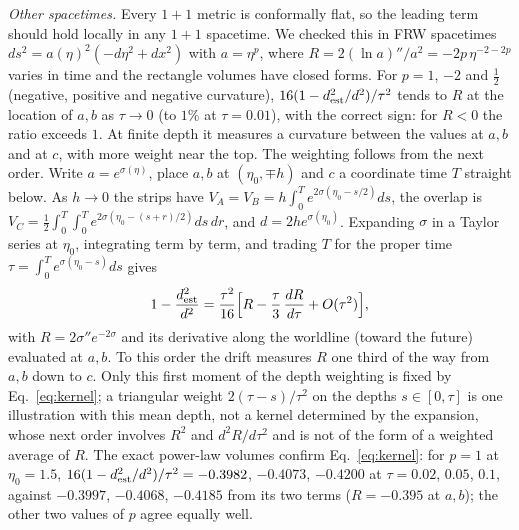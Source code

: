 \documentclass[prd,twocolumn,superscriptaddress,nofootinbib,amsmath,amssymb,floatfix]{revtex4-2}
\begin{document}
\emph{Other spacetimes.} Every $1+1$ metric is conformally flat, so the leading term should hold locally in any $1+1$ spacetime. We checked this in FRW spacetimes $ds^2=a(\eta)^2(-d\eta^2+dx^2)$ with $a=\eta^p$, where $R=2(\ln a)''/a^2=-2p\,\eta^{-2-2p}$ varies in time and the rectangle volumes have closed forms. For $p=1$, $-2$ and $\tfrac12$ (negative, positive and negative curvature), $16(1-d^2_{\rm est}/d^2)/\tau^2$ tends to $R$ at the location of $a,b$ as $\tau\to0$ (to $1\%$ at $\tau=0.01$), with the correct sign: for $R<0$ the ratio exceeds $1$. At finite depth it measures a curvature between the values at $a,b$ and at $c$, with more weight near the top. The weighting follows from the next order. Write $a=e^{\sigma(\eta)}$, place $a,b$ at $(\eta_0,\mp h)$ and $c$ a coordinate time $T$ straight below. As $h\to0$ the strips have $V_A=V_B=h\int_0^Te^{2\sigma(\eta_0-s/2)}ds$, the overlap is $V_C=\tfrac12\int_0^T\!\!\int_0^Te^{2\sigma(\eta_0-(s+r)/2)}ds\,dr$, and $d=2he^{\sigma(\eta_0)}$. Expanding $\sigma$ in a Taylor series at $\eta_0$, integrating term by term, and trading $T$ for the proper time $\tau=\int_0^Te^{\sigma(\eta_0-s)}ds$ gives
\begin{equation}
1-\frac{d^2_{\rm est}}{d^2}=\frac{\tau^2}{16}\Big[R-\frac{\tau}{3}\,\frac{dR}{d\tau}+O(\tau^2)\Big],
\label{eq:kernel}
\end{equation}
with $R=2\sigma''e^{-2\sigma}$ and its derivative along the worldline (toward the future) evaluated at $a,b$. To this order the drift measures $R$ one third of the way from $a,b$ down to $c$. Only this first moment of the depth weighting is fixed by Eq.~\eqref{eq:kernel}; a triangular weight $2(\tau-s)/\tau^2$ on the depths $s\in[0,\tau]$ is one illustration with this mean depth, not a kernel determined by the expansion, whose next order involves $R^2$ and $d^2R/d\tau^2$ and is not of the form of a weighted average of $R$. The exact power-law volumes confirm Eq.~\eqref{eq:kernel}: for $p=1$ at $\eta_0=1.5$, $16(1-d^2_{\rm est}/d^2)/\tau^2=-0.3982$, $-0.4073$, $-0.4200$ at $\tau=0.02$, $0.05$, $0.1$, against $-0.3997$, $-0.4068$, $-0.4185$ from its two terms ($R=-0.395$ at $a,b$); the other two values of $p$ agree equally well.
\end{document}

